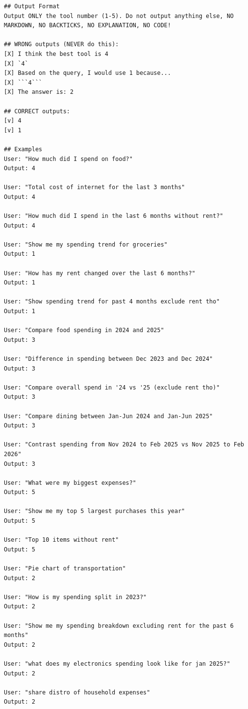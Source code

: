 \documentclass[11pt,twocolumn]{article}
\begin{document}
\begin{scriptsize}
\begin{verbatim}
## Output Format
Output ONLY the tool number (1-5). Do not output anything else, NO
MARKDOWN, NO BACKTICKS, NO EXPLANATION, NO CODE!

## WRONG outputs (NEVER do this):
[X] I think the best tool is 4
[X] `4`
[X] Based on the query, I would use 1 because...
[X] ```4```
[X] The answer is: 2

## CORRECT outputs:
[v] 4
[v] 1

## Examples
User: "How much did I spend on food?"
Output: 4

User: "Total cost of internet for the last 3 months"
Output: 4

User: "How much did I spend in the last 6 months without rent?"
Output: 4

User: "Show me my spending trend for groceries"
Output: 1

User: "How has my rent changed over the last 6 months?"
Output: 1

User: "Show spending trend for past 4 months exclude rent tho"
Output: 1

User: "Compare food spending in 2024 and 2025"
Output: 3

User: "Difference in spending between Dec 2023 and Dec 2024"
Output: 3

User: "Compare overall spend in '24 vs '25 (exclude rent tho)"
Output: 3

User: "Compare dining between Jan-Jun 2024 and Jan-Jun 2025"
Output: 3

User: "Contrast spending from Nov 2024 to Feb 2025 vs Nov 2025 to Feb 2026"
Output: 3

User: "What were my biggest expenses?"
Output: 5

User: "Show me my top 5 largest purchases this year"
Output: 5

User: "Top 10 items without rent"
Output: 5

User: "Pie chart of transportation"
Output: 2

User: "How is my spending split in 2023?"
Output: 2

User: "Show me my spending breakdown excluding rent for the past 6 months"
Output: 2

User: "what does my electronics spending look like for jan 2025?"
Output: 2

User: "share distro of household expenses"
Output: 2
\end{verbatim}
\end{scriptsize}
\end{document}
